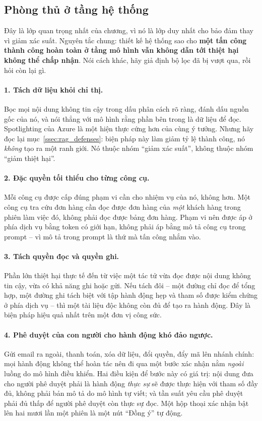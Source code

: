 \subsection{Phòng thủ ở tầng hệ thống}
\label{ssec:system_layer_defense}

Đây là lớp quan trọng nhất của chương, vì nó là lớp duy nhất cho bảo đảm thay vì giảm xác suất. Nguyên tắc chung: thiết kế hệ thống sao cho \textbf{một tấn công thành công hoàn toàn ở tầng mô hình vẫn không dẫn tới thiệt hại không thể chấp nhận}. Nói cách khác, hãy giả định bộ lọc đã bị vượt qua, rồi hỏi còn lại gì.

\paragraph{1. Tách dữ liệu khỏi chỉ thị.} Bọc mọi nội dung không tin cậy trong dấu phân cách rõ ràng, đánh dấu nguồn gốc của nó, và nói thẳng với mô hình rằng phần bên trong là dữ liệu để đọc. Spotlighting của Azure là một hiện thực cứng hơn của cùng ý tưởng. Nhưng hãy đọc lại mục~\ref{ssec:rag_defenses}: biện pháp này làm giảm tỷ lệ thành công, nó \emph{không} tạo ra một ranh giới. Nó thuộc nhóm ``giảm xác suất'', không thuộc nhóm ``giảm thiệt hại''.

\paragraph{2. Đặc quyền tối thiểu cho từng công cụ.} Mỗi công cụ được cấp đúng phạm vi cần cho nhiệm vụ của nó, không hơn. Một công cụ tra cứu đơn hàng cần đọc được đơn hàng của \emph{một} khách hàng trong phiên làm việc đó, không phải đọc được bảng đơn hàng. Phạm vi nên được áp ở phía dịch vụ bằng token có giới hạn, không phải áp bằng mô tả công cụ trong prompt -- vì mô tả trong prompt là thứ mà tấn công nhắm vào.

\paragraph{3. Tách quyền đọc và quyền ghi.} Phần lớn thiệt hại thực tế đến từ việc một tác tử vừa đọc được nội dung không tin cậy, vừa có khả năng ghi hoặc gửi. Nếu tách đôi -- một đường chỉ đọc để tổng hợp, một đường ghi tách biệt với tập hành động hẹp và tham số được kiểm chứng ở phía dịch vụ -- thì một tài liệu độc không còn đủ để tạo ra hành động. Đây là biện pháp hiệu quả nhất trên một đơn vị công sức.

\paragraph{4. Phê duyệt của con người cho hành động khó đảo ngược.} Gửi email ra ngoài, thanh toán, xóa dữ liệu, đổi quyền, đẩy mã lên nhánh chính: mọi hành động không thể hoàn tác nên đi qua một bước xác nhận nằm \emph{ngoài} luồng do mô hình điều khiển. Hai điều kiện để bước này có giá trị: nội dung đưa cho người phê duyệt phải là hành động \emph{thực sự} sẽ được thực hiện với tham số đầy đủ, không phải bản mô tả do mô hình tự viết; và tần suất yêu cầu phê duyệt phải đủ thấp để người phê duyệt còn thực sự đọc. Một hộp thoại xác nhận bật lên hai mươi lần một phiên là một nút ``Đồng ý'' tự động.

